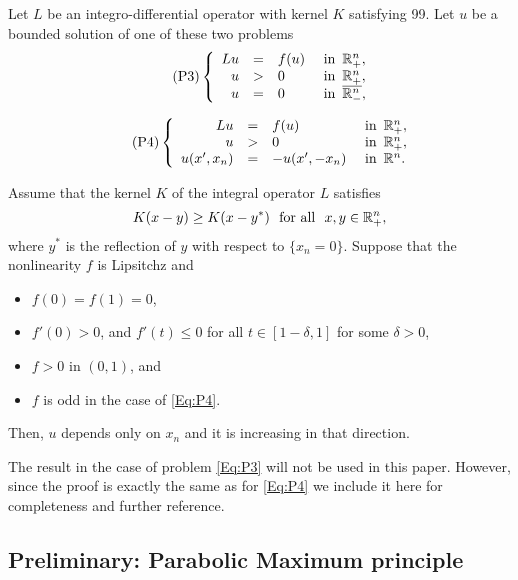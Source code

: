\begin{theorem}
	\label{Th:SymmHalfSpace}
	Let $L$ be an integro-differential operator with kernel $K$ satisfying 99. Let $u$ be a bounded solution of one of these two problems
	\begin{equation}
	\leqnomode
	\tag{P3}
	\label{Eq:P3}
	\beqc{\PDEsystem}
	Lu &=& f(u)   &\textrm{ in } \,\R^n_+,\\
	u &>& 0   &\textrm{ in } \,\R^n_+,\\
	u &=& 0   &\textrm{ in } \,\overline{\R^n_-},
	\eeqc
	\end{equation}
	
	\begin{equation}
	\leqnomode
	\tag{P4}
	\label{Eq:P4}
	\beqc{\PDEsystem}
	Lu &=& f(u)   &\textrm{ in } \,\R^n_+,\\
	u &>& 0   &\textrm{ in } \,\R^n_+,\\
	u(x',x_n) &=& -u(x',-x_n)   &\textrm{ in } \,\R^n.
	\eeqc
	\end{equation}
	
	\reqnomode
	
	Assume that the kernel $K$ of the integral operator $L$ satisfies
	$$
	K(x-y) \geq K(x-y^*) \,\,\,\,\text{for all } \,\, x,y\in \mathbb{R}^n_+,
	$$
	where $y^*$ is the reflection of $y$ with respect to $\{x_n = 0\}$. Suppose that the nonlinearity $f$ is Lipsitchz and
	\begin{itemize}
		\item $f(0) = f(1) = 0$,
		\item $f'(0)>0$, and $f'(t)\leq 0$ for all $t\in[1-\delta,1]$ for some $\delta>0$,
		\item $f>0$ in $(0,1)$, and
		\item $f$ is odd in the case of \eqref{Eq:P4}.
	\end{itemize}
	Then, $u$ depends only on $x_n$ and it is increasing in that direction.
\end{theorem}


The result in the case of problem \eqref{Eq:P3} will not be used in this paper. However, since the proof is exactly the same as for \eqref{Eq:P4} we include it here for completeness and further reference.

\subsection{Preliminary: Parabolic Maximum principle}





